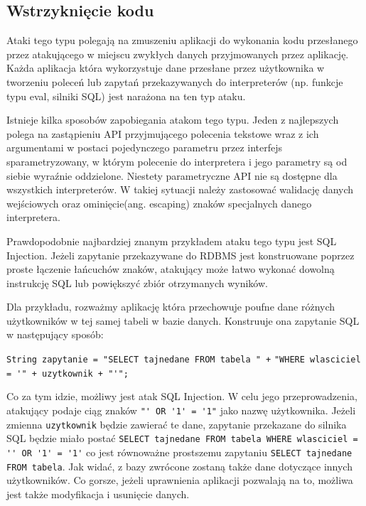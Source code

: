 \subsection{Wstrzyknięcie kodu}

	Ataki tego typu polegają na zmuszeniu aplikacji do wykonania kodu przesłanego przez atakującego w miejscu zwykłych danych przyjmowanych przez aplikację. Każda aplikacja która wykorzystuje dane przesłane przez użytkownika w tworzeniu poleceń lub zapytań przekazywanych do interpreterów (np. funkcje typu eval, silniki SQL) jest narażona na ten typ ataku.  
	
	Istnieje kilka sposobów zapobiegania atakom tego typu. Jeden z najlepszych polega na zastąpieniu API przyjmującego polecenia tekstowe wraz z ich argumentami w postaci pojedynczego parametru przez interfejs sparametryzowany, w którym polecenie do interpretera i jego parametry są od siebie wyraźnie oddzielone. Niestety  parametryczne API nie są  dostępne dla wszystkich interpreterów. W takiej sytuacji należy zastosować walidację danych wejściowych oraz ominięcie(ang. escaping) znaków specjalnych danego interpretera.
	
	Prawdopodobnie najbardziej znanym przykładem ataku tego typu jest SQL Injection. Jeżeli zapytanie przekazywane do RDBMS jest konstruowane poprzez proste łączenie łańcuchów znaków, atakujący może łatwo wykonać dowolną instrukcję SQL lub powiększyć zbiór otrzymanych wyników. 
	
	\lstset{language=Java}
	
	Dla przykładu, rozważmy aplikację która przechowuje poufne dane różnych użytkowników w tej samej tabeli w bazie danych. Konstruuje ona zapytanie SQL w następujący sposób:
	
	\lstinline|String zapytanie = "SELECT tajnedane FROM tabela " +| 
	\lstinline|"WHERE wlasciciel = '" + uzytkownik + "'";|
	
	Co za tym idzie, możliwy jest atak SQL Injection. W celu jego przeprowadzenia, atakujący podaje ciąg znaków \lstinline|"' OR '1' = '1"| jako nazwę użytkownika. Jeżeli zmienna \texttt{uzytkownik} będzie zawierać te dane, zapytanie przekazane do silnika SQL będzie miało postać
	\lstset{language=SQL}
	\lstinline|SELECT tajnedane FROM tabela WHERE wlasciciel = '' OR '1' = '1'| 
	co jest równoważne prostszemu zapytaniu
	\lstinline|SELECT tajnedane FROM tabela|.
	Jak widać, z bazy zwrócone zostaną także dane dotyczące innych użytkowników. Co gorsze, jeżeli uprawnienia aplikacji pozwalają na to, możliwa jest także modyfikacja i usunięcie danych.

